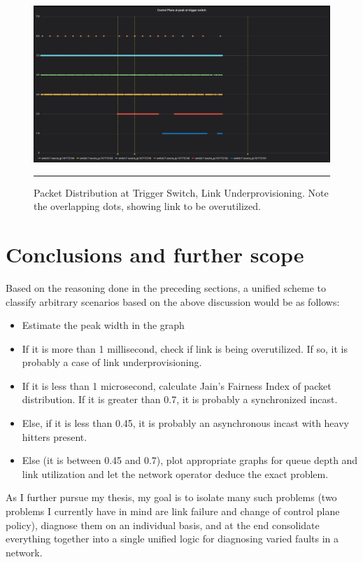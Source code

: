\begin{figure}[htbp]
	\centering
		\includegraphics[width=1.0\columnwidth]{Figures/distribution_under.png}
		\rule{35em}{0.5pt}
	\caption[Packet Distribution at Trigger Switch, Link Underprovisioning]{Packet Distribution at Trigger Switch, Link Underprovisioning. Note the overlapping dots, showing link to be overutilized.}
	\label{fig:distribution_under}
\end{figure}
\section{Conclusions and further scope}

Based on the reasoning done in the preceding sections, a unified scheme to classify arbitrary scenarios based on the above discussion would be as follows:
\begin{itemize}
	\item Estimate the peak width in the graph
	\item If it is more than 1 millisecond, check if link is being overutilized. If so, it is probably a case of link underprovisioning.
	\item If it is less than 1 microsecond, calculate Jain's Fairness Index of packet distribution. If it is greater than 0.7, it is probably a synchronized incast. 
	\item Else, if it is less than 0.45, it is probably an asynchronous incast with heavy hitters present.
	\item Else (it is between 0.45 and 0.7), plot appropriate graphs for queue depth and link utilization and let the network operator deduce the exact problem.
\end{itemize}

As I further pursue my thesis, my goal is to isolate many such problems (two problems I currently have in mind are link failure 
and change of control plane policy), diagnose them on an individual basis, and at the end consolidate everything together into a single unified logic for diagnosing 
varied faults in a network.